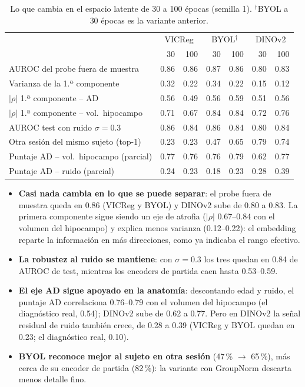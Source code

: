 \documentclass[11pt,a4paper]{article}
\begin{document}
\begin{table}[H]
\centering
\small
\begin{tabular}{lrrrrrr}
\toprule
 & \multicolumn{2}{c}{VICReg} & \multicolumn{2}{c}{BYOL$^{\dagger}$} & \multicolumn{2}{c}{DINOv2} \\
 & 30 & 100 & 30 & 100 & 30 & 100 \\
\midrule
AUROC del probe fuera de muestra & 0.86 & 0.86 & 0.87 & 0.86 & 0.80 & 0.83 \\
Varianza de la 1.ª componente & 0.32 & 0.22 & 0.34 & 0.22 & 0.15 & 0.12 \\
$|\rho|$ 1.ª componente -- AD & 0.56 & 0.49 & 0.56 & 0.59 & 0.51 & 0.56 \\
$|\rho|$ 1.ª componente -- vol.\ hipocampo & 0.71 & 0.67 & 0.84 & 0.84 & 0.72 & 0.76 \\
AUROC test con ruido $\sigma=0.3$ & 0.86 & 0.84 & 0.86 & 0.84 & 0.80 & 0.84 \\
Otra sesión del mismo sujeto (top-1) & 0.23 & 0.23 & 0.47 & 0.65 & 0.79 & 0.74 \\
Puntaje AD -- vol.\ hipocampo (parcial) & 0.77 & 0.76 & 0.76 & 0.79 & 0.62 & 0.77 \\
Puntaje AD -- ruido (parcial) & 0.24 & 0.23 & 0.18 & 0.23 & 0.28 & 0.39 \\
\bottomrule
\end{tabular}
\caption{Lo que cambia en el espacio latente de 30 a 100 épocas (semilla 1). $^{\dagger}$BYOL a 30
épocas es la variante anterior.}
\label{tab:latent100}
\end{table}

\begin{itemize}
\item \textbf{Casi nada cambia en lo que se puede separar}: el probe fuera de muestra queda en
  0.86 (VICReg y BYOL) y DINOv2 sube de 0.80 a 0.83. La primera componente sigue siendo un eje de
  atrofia ($|\rho|$ 0.67--0.84 con el volumen del hipocampo) y explica menos varianza (0.12--0.22):
  el embedding reparte la información en más direcciones, como ya indicaba el rango efectivo.
\item \textbf{La robustez al ruido se mantiene}: con $\sigma=0.3$ los tres quedan en 0.84 de AUROC
  de test, mientras los encoders de partida caen hasta 0.53--0.59.
\item \textbf{El eje AD sigue apoyado en la anatomía}: descontando edad y ruido, el puntaje AD
  correlaciona 0.76--0.79 con el volumen del hipocampo (el diagnóstico real, 0.54); DINOv2 sube
  de 0.62 a 0.77. Pero en DINOv2 la señal residual de ruido también crece, de 0.28 a 0.39
  (VICReg y BYOL quedan en 0.23; el diagnóstico real, 0.10).
\item \textbf{BYOL reconoce mejor al sujeto en otra sesión} (47\,\% $\rightarrow$ 65\,\%), más
  cerca de su encoder de partida (82\,\%): la variante con GroupNorm descarta menos detalle fino.
\end{itemize}
\end{document}
